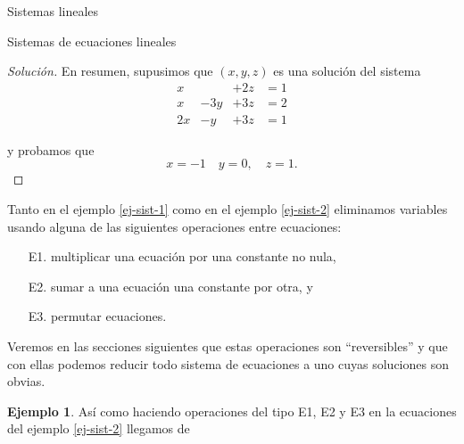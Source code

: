\documentclass[a4paper,12pt,twoside,spanish,reqno]{amsbook}
\theoremstyle{definition}
\newtheorem{ejemplo}{Ejemplo}[section]
\theoremstyle{remark}
\begin{document}
\begin{chapter}{Sistemas lineales}
\begin{section}{Sistemas de ecuaciones lineales}
\begin{proof}[Solución]
 

 
En resumen, supusimos que $(x,y,z)$ es una solución del sistema
\begin{equation*}
\begin{matrix}
x &  & +2z & = 1 \\
x& -3y & +3z & =2 \\
2x& -y & +3z & =1
\end{matrix}
\end{equation*}

y probamos que 
\begin{equation*}
x=-1\quad y=0,\quad z=1. 
\end{equation*}
                \end{proof}




Tanto en el ejemplo \ref{ej-sist-1} como en el ejemplo \ref{ej-sist-2} eliminamos variables usando alguna de las siguientes operaciones entre ecuaciones:
    \begin{enumerate}
        \item[E1.] multiplicar una ecuación por una constante no nula,  
        \item[E2.] sumar a una ecuación una constante por otra, y
        \item[E3.] permutar ecuaciones.  
    \end{enumerate}
    Veremos en  las secciones siguientes que estas operaciones son ``reversibles'' y que con ellas podemos reducir todo sistema de ecuaciones a uno cuyas soluciones son obvias. 
    
    
\begin{ejemplo}
Así como  haciendo operaciones del tipo E1, E2 y E3  en la ecuaciones del ejemplo \ref{ej-sist-2}   llegamos de 
    

\end{ejemplo}
\end{section}
\end{chapter}
\end{document}
